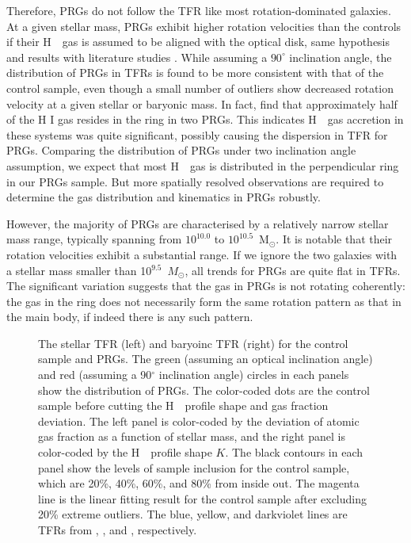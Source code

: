 \documentclass[twocolumn]{aastex631}
\newcommand{\msun}{$M_{\mathrm{\odot}}$}
\def\HI{H\,  {\textsc{\romannumeral 1}}}
\begin{document}
Therefore, PRGs do not follow the TFR like most rotation-dominated galaxies. At a given stellar mass, PRGs exhibit higher rotation velocities than the controls if their \HI\ gas is assumed to be aligned with the optical disk, same hypothesis and results with literature studies \citep{vanDriel2002A&A...386..140V, Iodice2003ApJ...585..730I}. While assuming a $90^\circ$ inclination angle, the distribution of PRGs in TFRs is found to be more consistent with that of the control sample, even though a small number of outliers show decreased rotation velocity at a given stellar or baryonic mass. In fact, \citet{Deg2023MNRAS.525.4663D} find that approximately half of the H I gas resides in the ring in two PRGs. This indicates \HI\ gas accretion in these systems was quite significant, possibly causing the dispersion in TFR for PRGs. Comparing the distribution of PRGs under two inclination angle assumption, we expect that most \HI\ gas is distributed in the perpendicular ring in our PRGs sample. But more spatially resolved observations are required to determine the gas distribution and kinematics in PRGs robustly.

However, the majority of PRGs are characterised by a relatively narrow stellar mass range, typically spanning from $10^{10.0}$ to $10^{10.5}$~M$_\odot$. It is notable that their rotation velocities exhibit a substantial range. If we ignore the two galaxies with a stellar mass smaller than 10$^{9.5}$~\msun, all trends for PRGs are quite flat in TFRs. The significant variation suggests that the gas in PRGs is not rotating coherently: the gas in the ring does not necessarily form the same rotation pattern as that in the main body, if indeed there is any such pattern.

\begin{figure}
\caption{
The stellar TFR (left) and baryoinc TFR (right) for the control sample and PRGs. The green (assuming an optical inclination angle) and red (assuming a 90$^{\circ}$ inclination angle) circles in each panels show the distribution of PRGs. The color-coded dots are the control sample before cutting the \HI\ profile shape and gas fraction deviation. The left panel is color-coded by the deviation of atomic gas fraction as a function of stellar mass, and the right panel is color-coded by the \HI\ profile shape $K$. The black contours in each panel show the levels of sample inclusion for the control sample, which are 20\%, 40\%, 60\%, and 80\% from inside out. The magenta line is the linear fitting result for the control sample after excluding 20\% extreme outliers. The blue, yellow, and darkviolet lines are TFRs from \citet{Bradford2016ApJ...832...11B}, \citet{McGaugh2012AJ....143...40M}, and \citet{Ball2023ApJ...950...87B}, respectively. 
}
\label{fig:tfr-prg}
\end{figure}
\end{document}

